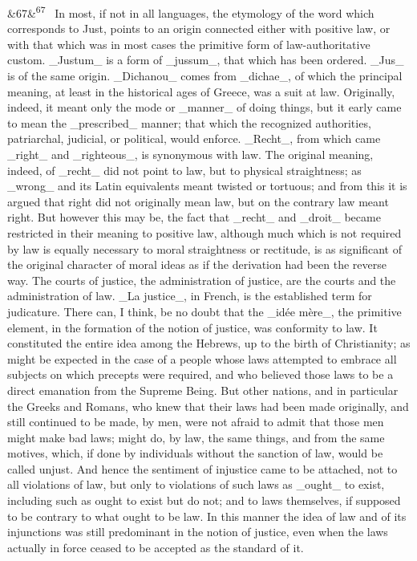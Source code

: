 \documentclass[12pt]{article}
\newcommand{\para}[1][]{\par\noindent\ifx&#1&\else\textsuperscript{\footnotesize #1}~\fi}
\begin{document}
\para[67] In most, if not in all languages, the etymology of the word which corresponds to Just, points to an origin connected either with positive law, or with that which was in most cases the primitive form of law-authoritative custom. \_Justum\_ is a form of \_jussum\_, that which has been ordered. \_Jus\_ is of the same origin. \_Dichanou\_ comes from \_dichae\_, of which the principal meaning, at least in the historical ages of Greece, was a suit at law. Originally, indeed, it meant only the mode or \_manner\_ of doing things, but it early came to mean the \_prescribed\_ manner; that which the recognized authorities, patriarchal, judicial, or political, would enforce. \_Recht\_, from which came \_right\_ and \_righteous\_, is synonymous with law. The original meaning, indeed, of \_recht\_ did not point to law, but to physical straightness; as \_wrong\_ and its Latin equivalents meant twisted or tortuous; and from this it is argued that right did not originally mean law, but on the contrary law meant right. But however this may be, the fact that \_recht\_ and \_droit\_ became restricted in their meaning to positive law, although much which is not required by law is equally necessary to moral straightness or rectitude, is as significant of the original character of moral ideas as if the derivation had been the reverse way. The courts of justice, the administration of justice, are the courts and the administration of law. \_La justice\_, in French, is the established term for judicature. There can, I think, be no doubt that the \_idée mère\_, the primitive element, in the formation of the notion of justice, was conformity to law. It constituted the entire idea among the Hebrews, up to the birth of Christianity; as might be expected in the case of a people whose laws attempted to embrace all subjects on which precepts were required, and who believed those laws to be a direct emanation from the Supreme Being. But other nations, and in particular the Greeks and Romans, who knew that their laws had been made originally, and still continued to be made, by men, were not afraid to admit that those men might make bad laws; might do, by law, the same things, and from the same motives, which, if done by individuals without the sanction of law, would be called unjust. And hence the sentiment of injustice came to be attached, not to all violations of law, but only to violations of such laws as \_ought\_ to exist, including such as ought to exist but do not; and to laws themselves, if supposed to be contrary to what ought to be law. In this manner the idea of law and of its injunctions was still predominant in the notion of justice, even when the laws actually in force ceased to be accepted as the standard of it.
\end{document}
